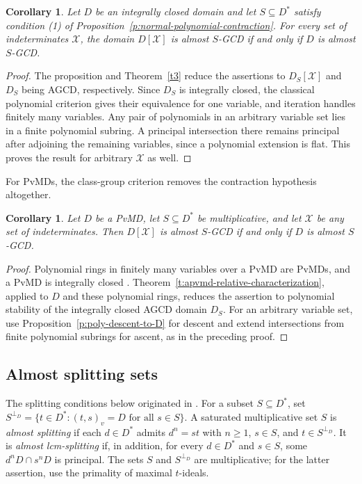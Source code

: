 \documentclass[11pt]{amsart}
\newtheorem{corollary}[theorem]{Corollary}
\theoremstyle{definition}
\theoremstyle{remark}
\begin{document}
\begin{corollary}\label{c:normal-polynomial-arbitrary}
\label{c:poly-transfer-two-descent}
Let $D$ be an integrally closed domain and let
$S\subseteq D^\ast$ satisfy condition (1) of
Proposition~\ref{p:normal-polynomial-contraction}.
For every set of indeterminates $\mathcal X$, the domain
$D[\mathcal X]$ is almost $S$-GCD if and only if $D$ is
almost $S$-GCD.
\end{corollary}
\begin{proof}
The proposition and Theorem~\ref{t3} reduce the assertions to
$D_S[\mathcal X]$ and $D_S$ being AGCD, respectively.
Since $D_S$ is integrally closed, the classical polynomial
criterion \cite[Theorem~3.4]{ATZ} gives their equivalence for
one variable, and iteration handles finitely many variables.
Any pair of polynomials in an arbitrary variable set lies in
a finite polynomial subring. A principal intersection there
remains principal after adjoining the remaining variables,
since a polynomial extension is flat. This proves the result
for arbitrary $\mathcal X$ as well.
\end{proof}

For PvMDs, the class-group criterion removes the contraction
hypothesis altogether.

\begin{corollary}\label{c:pvmd-polynomial-arbitrary}
Let $D$ be a PvMD, let $S\subseteq D^\ast$ be multiplicative,
and let $\mathcal X$ be any set of indeterminates. Then
$D[\mathcal X]$ is almost $S$-GCD if and only if $D$ is
almost $S$-GCD.
\end{corollary}
\begin{proof}
Polynomial rings in finitely many variables over a PvMD are
PvMDs, and a PvMD is integrally closed \cite{Kang}.
Theorem~\ref{t:apvmd-relative-characterization}, applied to
$D$ and these polynomial rings, reduces the assertion to
polynomial stability of the integrally closed AGCD domain
$D_S$. For an arbitrary variable set, use
Proposition~\ref{p:poly-descent-to-D} for descent and extend
intersections from finite polynomial subrings for ascent,
as in the preceding proof.
\end{proof}

\subsection{Almost splitting sets}

The splitting conditions below originated in \cite{ATZ}.
For a subset $S\subseteq D^\ast$, set
$S^{\perp_D}=\{t\in D^\ast:(t,s)_v=D\text{ for all }s\in S\}$.
A saturated multiplicative set $S$ is \emph{almost splitting}
if each $d\in D^\ast$ admits $d^n=st$ with $n\geq1$,
$s\in S$, and $t\in S^{\perp_D}$.
It is \emph{almost lcm-splitting} if, in addition, for every
$d\in D^\ast$ and $s\in S$, some $d^nD\cap s^nD$ is
principal. The sets $S$ and $S^{\perp_D}$ are multiplicative;
for the latter assertion, use the primality of maximal
$t$-ideals.
\end{document}
